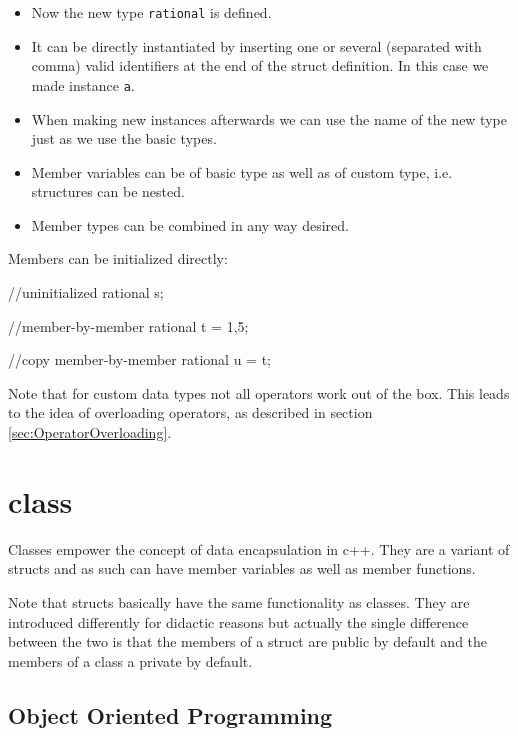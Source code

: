 \documentclass[10pt,a4paper]{scrartcl}
\begin{document}
\begin{multicols*}{2}
\begin{itemize}
\item Now the new type \verb+rational+ is defined.
\item It can be directly instantiated by inserting one or several (separated with comma) valid identifiers at the end of the struct definition. In this case we made instance \verb+a+.
\item When making new instances afterwards we can use the name of the new type just as we use the basic types.
\item Member variables can be of basic type as well as of custom type, i.e. structures can be nested.
\item Member types can be combined in any way desired.
\end{itemize}

Members can be initialized directly:

\begin{TPCpp}
//uninitialized
rational s;

//member-by-member
rational t = {1,5};

//copy member-by-member
rational u = t; 
\end{TPCpp}

Note that for custom data types not all operators work out of the box. This leads to the idea of overloading operators, as described in section \ref{sec:OperatorOverloading}.

\section{class}
\label{sec:class}

Classes empower the concept of data encapsulation in c++. They are a variant of structs and as such can have member variables as well as member functions. 

\vspace{3ex}

Note that structs basically have the same functionality as classes. They are introduced differently for didactic reasons but actually the single difference between the two is that the members of a struct are public by default and the members of a class a private by default.

\subsection{Object Oriented Programming}
\label{sec:ObjectOrientedProgramming}


\end{multicols*}
\end{document}
